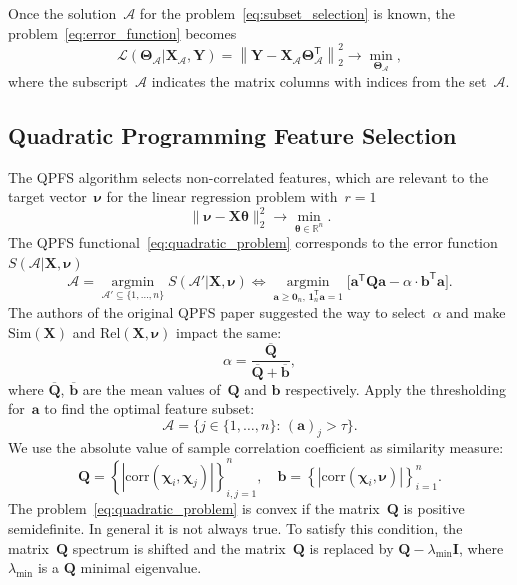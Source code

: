 \documentclass[12pt,twoside]{article}
\theoremstyle{definition}
\newcommand{\ba}{\mathbf{a}}
\newcommand{\bb}{\mathbf{b}}
\newcommand{\bY}{\mathbf{Y}}
\newcommand{\bX}{\mathbf{X}}
\newcommand{\bQ}{\mathbf{Q}}
\newcommand{\bbR}{\mathbb{R}}
\newcommand{\cA}{\mathcal{A}}
\newcommand{\T}{\mathsf{T}}
\newcommand{\bchi}{\boldsymbol{\chi}}
\newcommand{\bnu}{\boldsymbol{\nu}}
\newcommand{\btheta}{\boldsymbol{\theta}}
\newcommand{\bTheta}{\boldsymbol{\Theta}}
\newcommand{\bOne}{\boldsymbol{1}}
\newcommand{\bZero}{\boldsymbol{0}}
\newcommand{\argmin}{\mathop{\arg \min}\limits}
\begin{document}
Once the solution~$\cA$ for the problem~\eqref{eq:subset_selection} is known, the problem~\eqref{eq:error_function} becomes
\begin{equation}
\mathcal{L}(\bTheta_{\cA} | \bX_{\cA}, \bY) = {\left\| \mathbf{Y} - \bX_{\cA}\bTheta^{\T}_{\cA} \right\| }_2^2 \rightarrow\min_{\bTheta_{\cA}},
\end{equation}
where the subscript~$\cA$ indicates the matrix columns with indices from the set~$\cA$.

\subsection{Quadratic Programming Feature Selection}
The QPFS algorithm selects non-correlated features, which are relevant to the target vector~$\bnu$ for the linear regression problem with~$r=1$
\begin{equation*}
	\| \bnu - \bX \btheta\|_2^2 \rightarrow\min_{\btheta \in \bbR^{n}}.
\end{equation*}
The QPFS functional~\ref{eq:quadratic_problem} corresponds to the error function~$S(\cA | \bX, \bnu)$
\begin{equation*}
\cA = \argmin_{\cA' \subseteq \{1, \dots, n\}} S(\cA' | \bX, \bnu) \Leftrightarrow \argmin_{\ba \geq \bZero_n, \, \bOne_n^{\T}\ba=1} \bigl[\ba^{\T} \bQ \ba - \alpha \cdot \mathbf{b}^{\T} \ba \bigr].
\end{equation*}
The authors of the original QPFS paper suggested the way to select~$\alpha$ and make $\text{Sim}(\bX)$ and $\text{Rel}(\bX, \bnu)$ impact the same:
\begin{equation*}
	\alpha = \frac{\overline{\bQ}}{\overline{\bQ} + \overline{\bb}},
\end{equation*}
where $\overline{\bQ}$, $\overline{\bb}$ are the mean values of~$\bQ$ and $\bb$ respectively.
Apply the thresholding for~$\ba$ to find the optimal feature subset:
\[
	\cA = \bigl\{ j \in \{1, \dots, n\}: \, (\ba)_j > \tau \bigr\}.
\]
We use the absolute value of sample correlation coefficient as similarity measure:
\begin{equation}
	\bQ = \left\{\left|\text{corr}(\bchi_i, \bchi_j)\right|\right\}_{i,j=1}^n, \quad \bb = \left\{\left|\text{corr}(\bchi_i, \bnu)\right|\right\}_{i=1}^n.
	\label{eq:qpfs_1d_qb}
\end{equation}
The problem~\eqref{eq:quadratic_problem} is convex if the matrix~$\bQ$ is positive semidefinite. In general it is not always true.
To satisfy this condition, the matrix~$\bQ$ spectrum is shifted and the matrix~$\bQ$ is replaced by $\bQ - \lambda_{\text{min}} \mathbf{I}$, where $\lambda_{\text{min}} $ is a $\bQ$ minimal eigenvalue.
\end{document}
